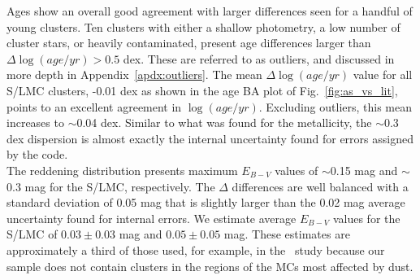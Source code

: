 \documentclass[draft]{aa}
\begin{document}
Ages show an overall good agreement with larger differences seen for a handful
of young clusters. Ten clusters with either a shallow photometry, a low number
of cluster stars, or heavily contaminated, present age differences larger than
$\Delta \log(age/yr){>}0.5$ dex. These are referred to as outliers, and
discussed in more depth in Appendix~\ref{apdx:outliers}.
%
%
The mean $\Delta \log(age/yr)$ value for all S/LMC clusters, -0.01 dex as shown
in the age BA plot of Fig.~\ref{fig:as_vs_lit}, points to an excellent agreement
in $\log(age/yr)$. Excluding outliers, this mean increases to $\sim$0.04 dex.
Similar to what was found for the metallicity, the $\sim$0.3 dex dispersion
is almost exactly the internal uncertainty found for errors assigned by the
code.\\

The reddening distribution presents maximum $E_{B-V}$ values of $\sim$0.15
mag and $\sim$0.3 mag for the S/LMC, respectively.
The $\Delta$ differences are well balanced with a standard deviation of 0.05
mag that is slightly larger than the 0.02 mag average uncertainty found for internal
errors. We estimate average $E_{B-V}$ values for the S/LMC of $0.03{\pm}0.03$
mag and $0.05{\pm}0.05$ mag.
These estimates are approximately a third of those used, for example, in
the~\cite{Hunter_2003} study because our sample does not contain clusters in the
regions of the MCs most affected by dust.\\
\end{document}
